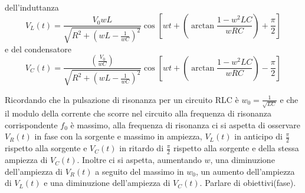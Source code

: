 \documentclass{article}
\begin{document}
dell'induttanza
\begin{equation}
  V_{L}(t)=\frac{V_{0}wL}{\sqrt{R^2+(wL-\frac{1}{wC})^2}}\cos{[wt+(\arctan{\frac{1-w^2LC}{wRC}})+\frac{\pi}{2}]}
\end{equation}
e del condensatore
\begin{equation}
  V_{C}(t)=\frac{(\frac{V_{0}}{wC})}{\sqrt{R^2+(wL-\frac{1}{wC})^2}}\cos{[wt+(\arctan{\frac{1-w^2LC}{wRC}})-\frac{\pi}{2}]}
\end{equation} 

Ricordando che la pulsazione di risonanza per un circuito RLC è $w_0=\frac{1}{\sqrt{LC}}$ e che il modulo della corrente che scorre nel circuito alla frequenza di risonanza corrispondente $f_0$ è massimo, alla frequenza di risonanza ci si aspetta di 
osservare $V_R(t)$ in fase con la sorgente e massimo in ampiezza, $V_L(t)$ in anticipo di $\frac{\pi}{2}$ rispetto alla sorgente e $V_C(t)$ in ritardo di $\frac{\pi}{2}$ rispetto alla sorgente e della stessa ampiezza di  $V_C(t)$. Inoltre ci 
si aspetta, aumentando $w$, una diminuzione dell'ampiezza di $V_R(t)$ a seguito del massimo in $w_0$, un aumento dell'ampiezza di  $V_L(t)$
e una diminuzione dell'ampiezza di $V_C(t)$. Parlare di obiettivi(fase).
\end{document}
